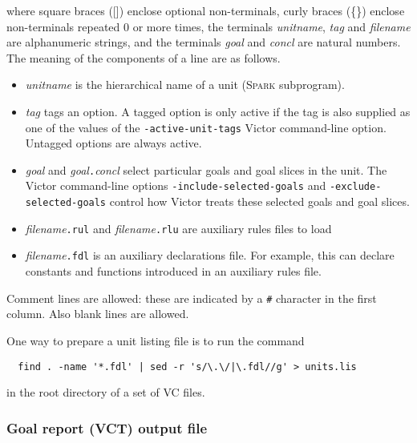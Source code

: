 \documentclass[12pt,fleqn]{article}
\newcommand{\spark}{\textsc{Spark}}
\begin{document}
\noindent
where square braces ([]) enclose optional non-terminals,
curly braces (\{\}) enclose non-terminals repeated 0 or more times,
%
the terminals \textit{unitname}, \textit{tag} and \textit{filename} are
alphanumeric strings, 
and the terminals \textit{goal} and \textit{concl} are natural numbers.
%
The meaning of the components of a line are as follows.
\begin{itemize}
\item \textit{unitname} is the hierarchical name of a unit (\spark{}
  subprogram).

\item \textit{tag} tags an option.  A tagged option is only active if
  the tag is also supplied as one of the values of the 
  \texttt{-active-unit-tags} Victor command-line option.
  Untagged options are always active.

\item \textit{goal} and \textit{goal}\texttt{.}\textit{concl} 
  select particular goals and goal slices in the unit. 
  The Victor command-line options 
  \texttt{-include-selected-goals} and
  \texttt{-exclude-selected-goals}
  control how Victor treats these selected goals and goal slices.

\item \textit{filename}\texttt{.rul} and
      \textit{filename}\texttt{.rlu} are auxiliary rules files to load

\item \textit{filename}\texttt{.fdl} is an auxiliary declarations file.
  For example, this can declare constants and functions introduced in 
  an auxiliary rules file.
\end{itemize}
Comment lines are allowed: these are indicated by a \texttt{\#}
character in the first column.  Also blank lines are allowed.  

One way to prepare a unit listing file is to run the command
\begin{verbatim}
  find . -name '*.fdl' | sed -r 's/\.\/|\.fdl//g' > units.lis
\end{verbatim}
in the root directory of a set of VC files.


\subsubsection{Goal report (VCT) output file}
\end{document}
